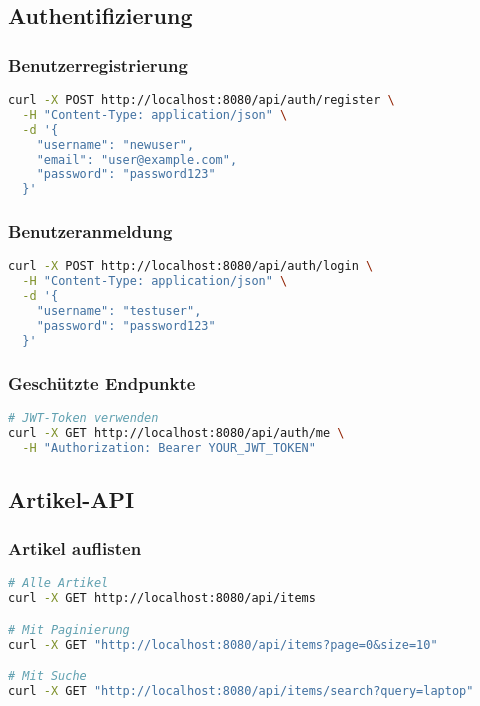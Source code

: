 \documentclass[a4paper,12pt]{article}
\begin{document}
\subsection{Authentifizierung}

\subsubsection{Benutzerregistrierung}
\begin{lstlisting}[language=bash]
curl -X POST http://localhost:8080/api/auth/register \
  -H "Content-Type: application/json" \
  -d '{
    "username": "newuser",
    "email": "user@example.com",
    "password": "password123"
  }'
\end{lstlisting}

\subsubsection{Benutzeranmeldung}
\begin{lstlisting}[language=bash]
curl -X POST http://localhost:8080/api/auth/login \
  -H "Content-Type: application/json" \
  -d '{
    "username": "testuser",
    "password": "password123"
  }'
\end{lstlisting}

\subsubsection{Geschützte Endpunkte}
\begin{lstlisting}[language=bash]
# JWT-Token verwenden
curl -X GET http://localhost:8080/api/auth/me \
  -H "Authorization: Bearer YOUR_JWT_TOKEN"
\end{lstlisting}

\subsection{Artikel-API}

\subsubsection{Artikel auflisten}
\begin{lstlisting}[language=bash]
# Alle Artikel
curl -X GET http://localhost:8080/api/items

# Mit Paginierung
curl -X GET "http://localhost:8080/api/items?page=0&size=10"

# Mit Suche
curl -X GET "http://localhost:8080/api/items/search?query=laptop"
\end{lstlisting}
\end{document}
